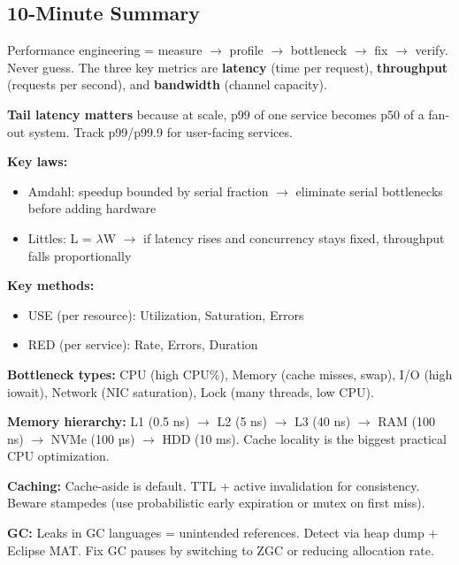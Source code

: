 \documentclass[11pt]{article}
\providecommand{\tightlist}{\setlength{\itemsep}{1pt}\setlength{\parskip}{0pt}}
\begin{document}
\subsection{10-Minute Summary}\label{10-minute-summary}

Performance engineering = measure \(\rightarrow\) profile \(\rightarrow\) bottleneck \(\rightarrow\) fix \(\rightarrow\) verify. Never guess. The three key metrics are \textbf{latency} (time per request), \textbf{throughput} (requests per second), and \textbf{bandwidth} (channel capacity).

\textbf{Tail latency matters} because at scale, p99 of one service becomes p50 of a fan-out system. Track p99/p99.9 for user-facing services.

\textbf{Key laws:}

\begin{itemize}
\tightlist
\item
  Amdahl: speedup bounded by serial fraction \(\rightarrow\) eliminate serial bottlenecks before adding hardware
\item
  Little\textquotesingle s: L = \(\lambda\)W \(\rightarrow\) if latency rises and concurrency stays fixed, throughput falls proportionally
\end{itemize}

\textbf{Key methods:}

\begin{itemize}
\tightlist
\item
  USE (per resource): Utilization, Saturation, Errors
\item
  RED (per service): Rate, Errors, Duration
\end{itemize}

\textbf{Bottleneck types:} CPU (high CPU\%), Memory (cache misses, swap), I/O (high iowait), Network (NIC saturation), Lock (many threads, low CPU).

\textbf{Memory hierarchy:} L1 (0.5 ns) \(\rightarrow\) L2 (5 ns) \(\rightarrow\) L3 (40 ns) \(\rightarrow\) RAM (100 ns) \(\rightarrow\) NVMe (100 µs) \(\rightarrow\) HDD (10 ms). Cache locality is the biggest practical CPU optimization.

\textbf{Caching:} Cache-aside is default. TTL + active invalidation for consistency. Beware stampedes (use probabilistic early expiration or mutex on first miss).

\textbf{GC:} Leaks in GC languages = unintended references. Detect via heap dump + Eclipse MAT. Fix GC pauses by switching to ZGC or reducing allocation rate.
\end{document}
